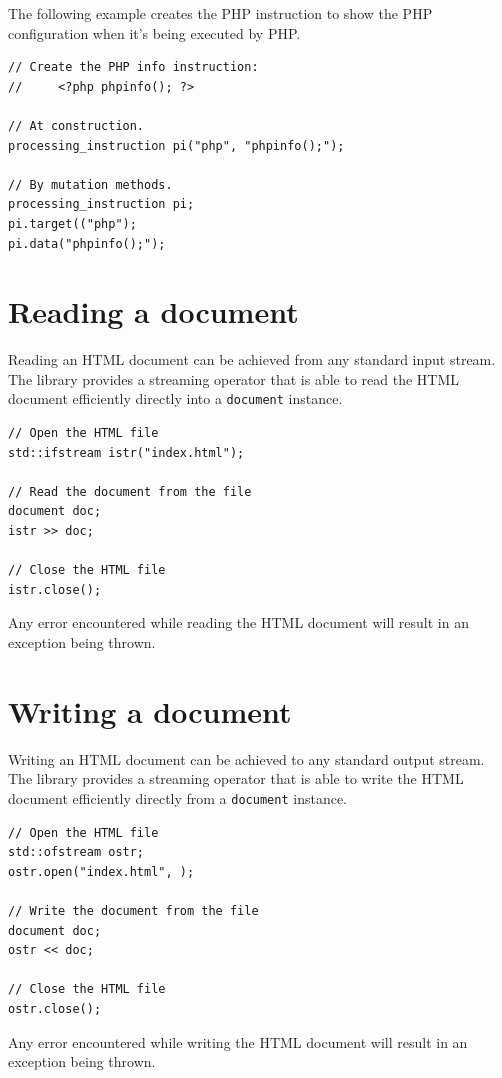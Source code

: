 \documentclass[10pt,a4paper,openany]{mudbook}
\begin{document}
The following example creates the PHP instruction to show the PHP configuration
when it's being executed by PHP.

\begin{lstlisting}[style=snippet]
// Create the PHP info instruction:
//     <?php phpinfo(); ?>  

// At construction.
processing_instruction pi("php", "phpinfo();");

// By mutation methods.
processing_instruction pi;
pi.target(("php");
pi.data("phpinfo();");
\end{lstlisting}

\section{Reading a document}

Reading an HTML document can be achieved from any standard input stream. The
\MUDLib library provides a streaming operator that is able to read the HTML
document efficiently directly into a \texttt{document} instance.

\begin{lstlisting}[style=snippet]
// Open the HTML file
std::ifstream istr("index.html");

// Read the document from the file
document doc;
istr >> doc;

// Close the HTML file
istr.close();
\end{lstlisting}

Any error encountered while reading the HTML document will result in an
exception being thrown.

\section{Writing a document}

Writing an HTML document can be achieved to any standard output stream. The
\MUDLib library provides a streaming operator that is able to write the HTML
document efficiently directly from a \texttt{document} instance.

\begin{lstlisting}[style=snippet]
// Open the HTML file
std::ofstream ostr;
ostr.open("index.html", );

// Write the document from the file
document doc;
ostr << doc;

// Close the HTML file
ostr.close();
\end{lstlisting}

Any error encountered while writing the HTML document will result in an
exception being thrown.
\end{document}
